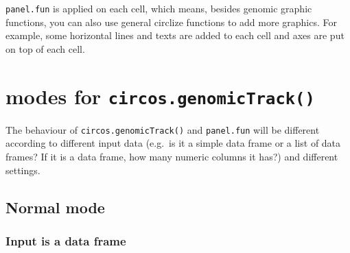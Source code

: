 \documentclass[]{book}
\newenvironment{Shaded}{\begin{snugshade}}{\end{snugshade}}
\newcommand{\KeywordTok}[1]{\textcolor[rgb]{0.13,0.29,0.53}{\textbf{#1}}}
\newcommand{\DataTypeTok}[1]{\textcolor[rgb]{0.13,0.29,0.53}{#1}}
\newcommand{\DecValTok}[1]{\textcolor[rgb]{0.00,0.00,0.81}{#1}}
\newcommand{\FloatTok}[1]{\textcolor[rgb]{0.00,0.00,0.81}{#1}}
\newcommand{\StringTok}[1]{\textcolor[rgb]{0.31,0.60,0.02}{#1}}
\newcommand{\ControlFlowTok}[1]{\textcolor[rgb]{0.13,0.29,0.53}{\textbf{#1}}}
\newcommand{\OperatorTok}[1]{\textcolor[rgb]{0.81,0.36,0.00}{\textbf{#1}}}
\newcommand{\NormalTok}[1]{#1}
\theoremstyle{definition}
\theoremstyle{definition}
\theoremstyle{remark}
\begin{document}
\texttt{panel.fun} is applied on each cell, which means, besides genomic
graphic functions, you can also use general circlize functions to add
more graphics. For example, some horizontal lines and texts are added to
each cell and axes are put on top of each cell.

\begin{Shaded}
\end{Shaded}

\chapter{\texorpdfstring{modes for
\texttt{circos.genomicTrack()}}{modes for circos.genomicTrack()}}\label{modes-of-input}

The behaviour of \texttt{circos.genomicTrack()} and \texttt{panel.fun}
will be different according to different input data (e.g.~is it a simple
data frame or a list of data frames? If it is a data frame, how many
numeric columns it has?) and different settings.

\section{Normal mode}\label{normal-mode}

\subsection{Input is a data frame}\label{input-is-a-data-frame}
\end{document}
